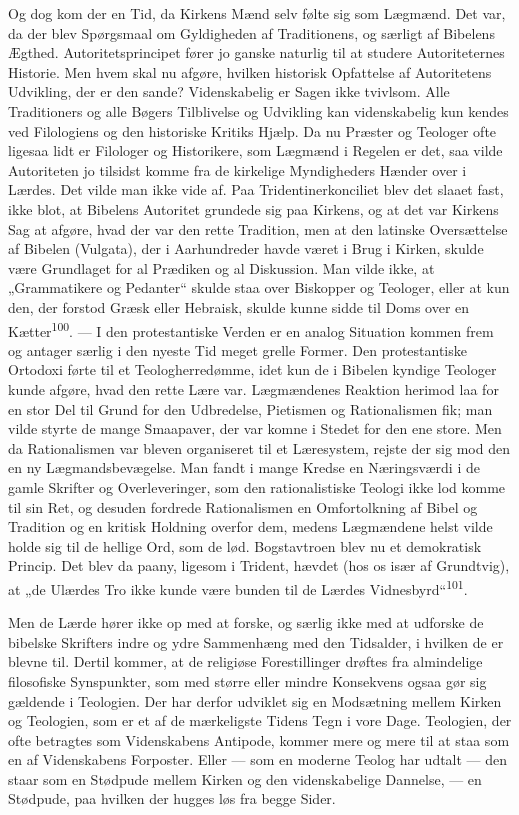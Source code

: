 \documentclass[12pt,a4paper,openany]{book}
\newcommand{\opage}[1]{\marginnote{\footnotesize\textit{[#1]}}}
\begin{document}
Og dog kom der en Tid, da Kirkens Mænd selv følte sig som Lægmænd. Det
var, da der blev Spørgsmaal om Gyldigheden af Traditionens, og særligt
af Bibelens Ægthed. Autoritetsprincipet fører jo ganske naturlig til at
studere Autoriteternes Historie. Men hvem skal nu afgøre, hvilken
historisk Opfattelse af Autoritetens Udvikling, der er den sande?
Videnskabelig er Sagen ikke tvivlsom. Alle Traditioners og alle Bøgers
Tilblivelse og Udvikling kan videnskabelig kun kendes ved Filologiens og
den historiske Kritiks Hjælp. Da nu Præster og Teologer ofte ligesaa
lidt er Filologer og Historikere, som Lægmænd i Regelen er det, saa
vilde Autoriteten jo tilsidst komme fra de kirkelige Myndigheders Hænder
over i Lærdes. Det vilde man ikke vide af. Paa Tridentinerkonciliet blev
det slaaet fast, ikke blot, at Bibelens Autoritet grundede sig paa
Kirkens, og at det var Kirkens Sag at afgøre, hvad der var den rette
Tradition, men at den latinske Oversættelse af Bibelen (Vulgata), der i
Aarhundreder havde været i Brug i Kirken, skulde være Grundlaget for al
Prædiken og al Diskussion. Man vilde ikke, at „Grammatikere og Pedanter“
skulde staa over Biskopper og Teologer, eller at kun den, der forstod
Græsk eller Hebraisk, skulde kunne sidde til Doms over en
Kætter\textsuperscript{100}. --- I den protestantiske Verden er en
analog Situation kommen frem og antager særlig i den nyeste Tid meget
grelle Former. Den protestantiske Ortodoxi førte til et
Teologherredømme, idet kun de i Bibelen kyndige Teologer kunde afgøre,
hvad den rette Lære var. Lægmændenes Reaktion herimod laa for en stor
Del til Grund for den Udbredelse, Pietismen og Rationalismen fik; man
vilde styrte de mange Smaapaver, der var komne i Stedet for den ene
store. Men da Rationalismen var bleven organiseret til et Læresystem,
rejste der sig mod den en ny Lægmandsbevægelse. Man fandt i mange Kredse
en Næringsværdi i de gamle Skrifter og Overleveringer, som den
rationalistiske Teologi ikke lod komme til sin Ret, og desuden fordrede
Rationalismen en Omfortolkning af Bibel og Tradition og en kritisk
Holdning overfor dem, medens Lægmændene helst vilde holde sig til de
hellige Ord, som de lød. Bogstavtroen blev nu et demokratisk Princip.
Det blev da paany, ligesom i Trident, hævdet (hos
\opage{207}os især af Grundtvig), at „de Ulærdes Tro ikke kunde være
bunden til de Lærdes Vidnesbyrd“\textsuperscript{101}.

Men de Lærde hører ikke op med at forske, og særlig ikke med at udforske
de bibelske Skrifters indre og ydre Sammenhæng med den Tidsalder, i
hvilken de er blevne til. Dertil kommer, at de religiøse Forestillinger
drøftes fra almindelige filosofiske Synspunkter, som med større eller
mindre Konsekvens ogsaa gør sig gældende i Teologien. Der har derfor
udviklet sig en Modsætning mellem Kirken og Teologien, som er et af de
mærkeligste Tidens Tegn i vore Dage. Teologien, der ofte betragtes som
Videnskabens Antipode, kommer mere og mere til at staa som en af
Videnskabens Forposter. Eller --- som en moderne Teolog har udtalt ---
den staar som en Stødpude mellem Kirken og den videnskabelige Dannelse,
--- en Stødpude, paa hvilken der hugges løs fra begge Sider.
\end{document}
